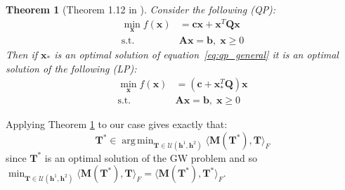 \documentclass{article}
\newcommand{\scalar}[2]{\langle #1 , #2 \rangle}
\def\eqref#1{equation~\ref{#1}}
\def\vh{{\bm{h}}}
\def\mM{{\bm{M}}}
\def\mT{{\bm{T}}}
\DeclareMathOperator*{\argmin}{arg\,min}
\newcommand{\xbf}{\mathbf{x}}
\newtheorem{theorem}{Theorem}
\begin{document}
	\begin{theorem}[Theorem 1.12 in \cite{murty-linear-1988}]
		\label{murty_theo}
		Consider the following (QP):
		\begin{equation}
		\label{eq:qp_general}
		\begin{array}{cl}{\min _{\xbf} f(\xbf)} & {=\mathbf{c} \xbf+\xbf^{T} \mathbf{Q} \xbf} \\ {\text {s.t.}} & {\mathbf{A} \xbf = \mathbf{b}},\;  {\xbf \geq 0}\end{array}
		\end{equation}
		Then if $\xbf_{*}$ is an optimal solution of \eqref{eq:qp_general} it is an optimal solution of the following (LP):
		\begin{equation}
		\label{eq:lp_general}
		\begin{array}{cl}{\min _{\xbf} f(\xbf)} & {=(\mathbf{c} + \xbf_{*}^{T}\mathbf{Q} )  \xbf} \\ {\text {s.t.}} & {\mathbf{A} \xbf = \mathbf{b}},\;  {\xbf \geq 0}\end{array}
		\end{equation}
	\end{theorem}
	
	Applying Theorem \ref{murty_theo} to our case gives exactly that: 
	\begin{equation}
	\label{eq:gpislp}
	\mT^{*} \in \argmin_{\mT \in \mathcal{U}(\vh^1,\vh^2)} \scalar{\mM(\mT^{*})}{\mT}_{F}
	\end{equation}
	since $\mT^{*}$ is an optimal solution of the GW problem and so $\min_{\mT \in \mathcal{U}(\vh^1,\vh^2)} \scalar{\mM(\mT^{*})}{\mT}_{F}=\scalar{\mM(\mT^{*})}{\mT^{*}}_{F}$. 
	
	
	
\end{document}
